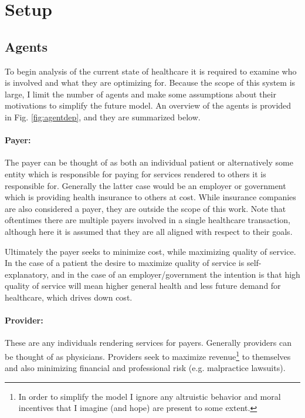 \documentclass{article}
\begin{document}
\section{Setup}

\subsection{Agents}
To begin analysis of the current state of healthcare it is required to examine who is involved and what they are optimizing for. Because the scope of this system is large, I limit the number of agents and make some assumptions about their motivations to simplify the future model. An overview of the agents is provided in Fig. \ref{fig:agentdep}, and they are summarized below.

\paragraph{Payer:}The payer can be thought of as both an individual patient or alternatively some entity which is responsible for paying for services rendered to others it is responsible for. Generally the latter case would be an employer or government which is providing health insurance to others at cost. While insurance companies are also considered a payer, they are outside the scope of this work. Note that oftentimes there are multiple payers involved in a single healthcare transaction, although here it is assumed that they are all aligned with respect to their goals.

Ultimately the payer seeks to minimize cost, while maximizing quality of service. In the case of a patient the desire to maximize quality of service is self-explanatory, and in the case of an employer/government the intention is that high quality of service will mean higher general health and less future demand for healthcare, which drives down cost.

\paragraph{Provider:}These are any individuals rendering services for payers. Generally providers can be thought of as physicians. Providers seek to maximize revenue\footnote{In order to simplify the model I ignore any altruistic behavior and moral incentives that I imagine (and hope) are present to some extent.} to themselves and also minimizing financial and professional risk (e.g. malpractice lawsuits).
\end{document}
